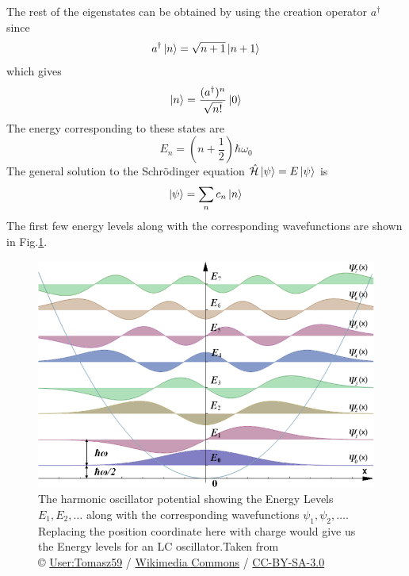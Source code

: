 The rest of the eigenstates can be obtained by using the creation operator $a^\dag$ since
\begin{equation}
a^\dag\ket{n}=\sqrt{n+1}\ket{n+1}
\end{equation}
which gives
\begin{equation}
\ket{n}=\frac{(a^\dag)^n}{\sqrt{n!}}\ket{0}
\end{equation}
The energy corresponding to these states are
\begin{equation}
E_n=\left(n+\frac{1}{2}\right)\hbar\omega_0
\end{equation}
The general solution to the Schr\"{o}dinger equation $\hat{\mathcal{H}}\ket{\psi}=E\ket{\psi}$ is
\begin{equation}
\ket{\psi}=\sum_nc_n\ket{n}
\end{equation}
The first few energy levels along with the corresponding wavefunctions are shown in Fig.\ref{fig:harmonic oscillator}.

\begin{figure}
\centering
\includegraphics[width=\linewidth]{Figures/harmonic_oscillator}
\decoRule
\caption[Harmonic Oscillator Energy Levels]{The harmonic oscillator potential showing the Energy Levels $E_1,E_2,\ldots$ along with the corresponding wavefunctions $\psi_1,\psi_2,\ldots$. Replacing the position coordinate here with charge would give us the Energy levels for an LC oscillator.Taken from \\© \href{https://pl.wikipedia.org/wiki/Wikipedysta:Tomasz59}{User:Tomasz59} / \href{http://commons.wikimedia.org/}{Wikimedia Commons} / \href{http://creativecommons.org/licenses/by-sa/3.0/}{CC-BY-SA-3.0}}
\label{fig:harmonic oscillator}
\end{figure}

